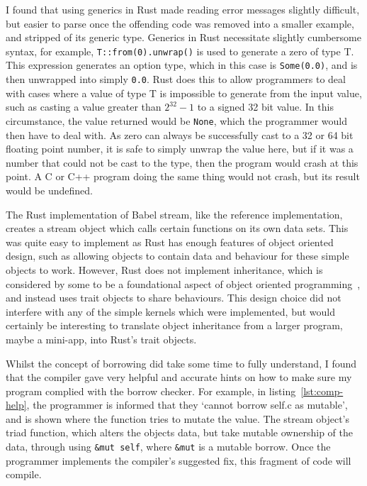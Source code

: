 I found that using generics in Rust made reading error messages slightly difficult, but easier to parse once the offending code was removed into a smaller example, and stripped of its generic type. Generics in Rust necessitate slightly cumbersome syntax, for example, \texttt{T::from(0).unwrap()} is used to generate a zero of type T. This expression generates an option type, which in this case is \texttt{Some(0.0)}, and is then unwrapped into simply \texttt{0.0}. Rust does this to allow programmers to deal with cases where a value of type T is impossible to generate from the input value, such as casting a value greater than $2^{32} - 1$ to a signed 32 bit value. In this circumstance, the value returned would be \texttt{None}, which the programmer would then have to deal with. As zero can always be successfully cast to a 32 or 64 bit floating point number, it is safe to simply unwrap the value here, but if it was a number that could not be cast to the type, then the program would crash at this point. A C or C++ program doing the same thing would not crash, but its result would be undefined. 

The Rust implementation of Babel stream, like the reference implementation, creates a stream object which calls certain functions on its own data sets. This was quite easy to implement as Rust has enough features of object oriented design, such as allowing objects to contain data and behaviour for these simple objects to work. However, Rust does not implement inheritance, which is considered by some to be a foundational aspect of object oriented programming~\cite{Liskov:1987}, and instead uses trait objects to share behaviours. This design choice did not interfere with any of the simple kernels which were implemented, but would certainly be interesting to translate object inheritance from a larger program, maybe a mini-app, into Rust's trait objects.

Whilst the concept of borrowing did take some time to fully understand, I found that the compiler gave very helpful and accurate hints on how to make sure my program complied with the borrow checker. For example, in listing~\ref{lst:comp-help}, the programmer is informed that they `cannot borrow self.c as mutable', and is shown where the function tries to mutate the value. The stream object's triad function, which alters the objects data, but take mutable ownership of the data, through using \texttt{\&mut self}, where \texttt{\&mut} is a mutable borrow. Once the programmer implements the compiler's suggested fix, this fragment of code will compile.

